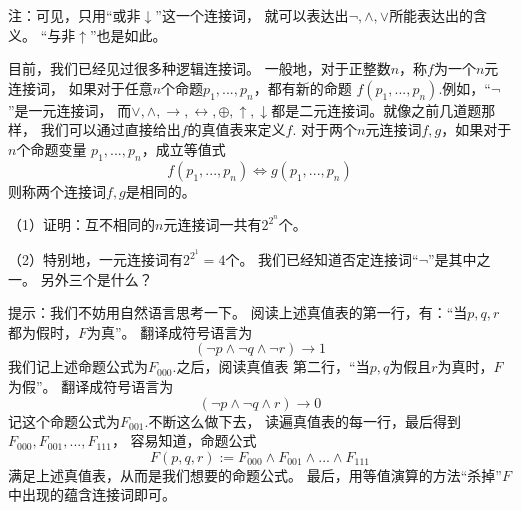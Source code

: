 注：可见，只用“或非$\downarrow$”这一个连接词，
就可以表达出$\neg,\wedge,\vee$所能表达出的含义。
“与非$\uparrow$”也是如此。\vs

\begin{prob}[一般的多元连接词]
目前，我们已经见过很多种逻辑连接词。
一般地，对于正整数$n$，称$f$为一个$n$元连接词，
如果对于任意$n$个命题$p_1,...,p_n$，都有新的命题
$f(p_1,...,p_n)$.例如，“$\neg$”是一元连接词，
而$\vee,\wedge,\rightarrow,\leftrightarrow,\oplus,
\uparrow,\downarrow$都是二元连接词。就像之前几道题那样，
我们可以通过直接给出$f$的真值表来定义$f$.
对于两个$n$元连接词$f,g$，如果对于$n$个命题变量
$p_1,...,p_n$，成立等值式
$$f(p_1,...,p_n)\Leftrightarrow g(p_1,...,p_n)$$
则称两个连接词$f,g$是相同的。

（1）证明：互不相同的$n$元连接词一共有$2^{2^n}$个。

（2）特别地，一元连接词有$2^{2^1}=4$个。
我们已经知道否定连接词“$\neg$”是其中之一。
另外三个是什么？
\end{prob}\vs


提示：我们不妨用自然语言思考一下。
阅读上述真值表的第一行，有：“当$p,q,r$都为假时，$F$为真”。
翻译成符号语言为
$$(\neg p\wedge \neg q\wedge\neg r)\rightarrow 1$$
我们记上述命题公式为$F_{000}$.之后，阅读真值表
第二行，“当$p,q$为假且$r$为真时，$F$为假”。
翻译成符号语言为
$$(\neg p\wedge \neg q\wedge r)\rightarrow 0$$
记这个命题公式为$F_{001}$.不断这么做下去，
读遍真值表的每一行，最后得到$F_{000},F_{001},...,F_{111}$，
容易知道，命题公式
$$F(p,q,r):=F_{000}\wedge F_{001}\wedge...\wedge F_{111}$$
满足上述真值表，从而是我们想要的命题公式。
最后，用等值演算的方法“杀掉”$F$中出现的蕴含连接词即可。\vs

